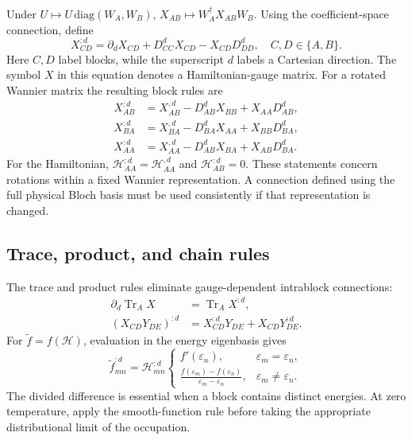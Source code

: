 \documentclass[prx,amsmath,amssymb,superscriptaddress,longbibliography]{revtex4-2}
\newcommand{\Tr}{\operatorname{Tr}}
\begin{document}
Under $U\mapsto U\,\mathrm{diag}(W_A,W_B)$,
$X_{AB}\mapsto W_A^\dagger X_{AB}W_B$.
Using the coefficient-space connection, define~\cite{Liu2023CovariantderivativesBerry}
\begin{equation}
 X_{CD}^{:d}=\partial_d X_{CD}+D_{CC}^d X_{CD}-X_{CD}D_{DD}^d,
 \quad C,D\in\{A,B\}.
 \label{eq:cov-derivative}
\end{equation}
Here $C,D$ label blocks, while the superscript $d$ labels a Cartesian direction.
The symbol $X$ in this equation denotes a Hamiltonian-gauge matrix.
For a rotated Wannier matrix the resulting block rules are
\begin{align}
 X_{AB}^{:d}&=X_{AB}^{,d}-D_{AB}^dX_{BB}+X_{AA}D_{AB}^d,\label{eq:block-ab}\\
 X_{BA}^{:d}&=X_{BA}^{,d}-D_{BA}^dX_{AA}+X_{BB}D_{BA}^d,\\
 X_{AA}^{:d}&=X_{AA}^{,d}-D_{AB}^dX_{BA}+X_{AB}D_{BA}^d.
 \label{eq:block-aa}
\end{align}
For the Hamiltonian, $\mathcal H_{AA}^{:d}=\mathcal H_{AA}^{,d}$ and
$\mathcal H_{AB}^{:d}=0$.
These statements concern rotations within a fixed Wannier representation.
A connection defined using the full physical Bloch basis must be used
consistently if that representation is changed.

\subsection{Trace, product, and chain rules}
The trace and product rules eliminate gauge-dependent intrablock connections:
\begin{align}
 \partial_d\Tr_A X&=\Tr_A X^{:d},
 \label{eq:trace}\\
 (X_{CD}Y_{DE})^{:d}&=X_{CD}^{:d}Y_{DE}+X_{CD}Y_{DE}^{:d}.
 \label{eq:product}
\end{align}
For $\widetilde f=f(\mathcal H)$, evaluation in the energy eigenbasis gives
\begin{equation}
 \widetilde f_{mn}^{:d}=\mathcal H_{mn}^{:d}
 \begin{cases}
 f'(\varepsilon_n),&\varepsilon_m=\varepsilon_n,\\[2pt]
 \displaystyle\frac{f(\varepsilon_m)-f(\varepsilon_n)}{\varepsilon_m-\varepsilon_n},
 &\varepsilon_m\ne\varepsilon_n.
 \end{cases}
 \label{eq:chain}
\end{equation}
The divided difference is essential when a block contains distinct energies.
At zero temperature, apply the smooth-function rule before taking the
appropriate distributional limit of the occupation.
\end{document}
